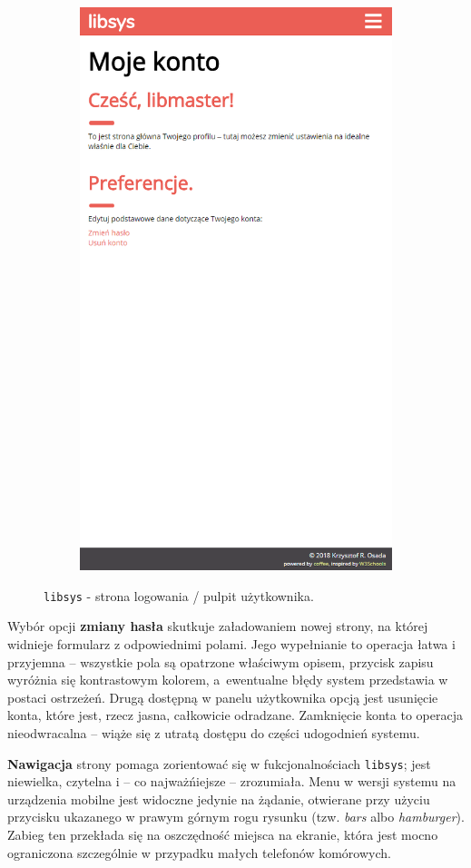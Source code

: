 \documentclass[12pt, a4paper]{article}
\begin{document}
\begin{figure}[h]
\begin{subfigure}{.4\textwidth}
    \includegraphics[width=.75\linewidth]{img/libsys_account_2.png}
\end{subfigure}
\caption{\texttt{libsys} - strona logowania / pulpit użytkownika.}
\end{figure}

Wybór opcji \textbf{zmiany hasła} skutkuje załadowaniem nowej strony, na której widnieje formularz z odpowiednimi polami. Jego wypełnianie to operacja łatwa i przyjemna -- wszystkie pola są opatrzone właściwym opisem, przycisk zapisu wyróżnia się kontrastowym kolorem, a~ewentualne błędy system przedstawia w postaci ostrzeżeń. Drugą dostępną w panelu użytkownika opcją jest usunięcie konta, które jest, rzecz jasna, całkowicie odradzane. Zamknięcie konta to operacja nieodwracalna -- wiąże się z utratą dostępu do części udogodnień systemu.

\textbf{Nawigacja} strony pomaga zorientować się w fukcjonalnościach \texttt{libsys}; jest niewielka, czytelna i -- co najważńiejsze -- zrozumiała. Menu w wersji systemu na urządzenia mobilne jest widoczne jedynie na żądanie, otwierane przy użyciu przycisku ukazanego w prawym górnym rogu rysunku (tzw. \textit{bars} albo \textit{hamburger}). Zabieg ten przekłada się na oszczędność miejsca na ekranie, która jest mocno ograniczona szczególnie w przypadku małych telefonów komórowych.
\end{document}
